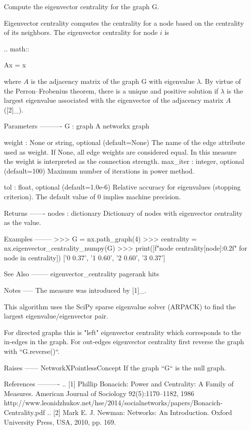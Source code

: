 \begin{DoxyVerb}Compute the eigenvector centrality for the graph G.

Eigenvector centrality computes the centrality for a node based on the
centrality of its neighbors. The eigenvector centrality for node $i$ is

.. math::

    Ax = \lambda x

where $A$ is the adjacency matrix of the graph G with eigenvalue $\lambda$.
By virtue of the Perron–Frobenius theorem, there is a unique and positive
solution if $\lambda$ is the largest eigenvalue associated with the
eigenvector of the adjacency matrix $A$ ([2]_).

Parameters
----------
G : graph
  A networkx graph

weight : None or string, optional (default=None)
  The name of the edge attribute used as weight.
  If None, all edge weights are considered equal.
  In this measure the weight is interpreted as the connection strength.
max_iter : integer, optional (default=100)
  Maximum number of iterations in power method.

tol : float, optional (default=1.0e-6)
   Relative accuracy for eigenvalues (stopping criterion).
   The default value of 0 implies machine precision.

Returns
-------
nodes : dictionary
   Dictionary of nodes with eigenvector centrality as the value.

Examples
--------
>>> G = nx.path_graph(4)
>>> centrality = nx.eigenvector_centrality_numpy(G)
>>> print([f"{node} {centrality[node]:0.2f}" for node in centrality])
['0 0.37', '1 0.60', '2 0.60', '3 0.37']

See Also
--------
eigenvector_centrality
pagerank
hits

Notes
-----
The measure was introduced by [1]_.

This algorithm uses the SciPy sparse eigenvalue solver (ARPACK) to
find the largest eigenvalue/eigenvector pair.

For directed graphs this is "left" eigenvector centrality which corresponds
to the in-edges in the graph. For out-edges eigenvector centrality
first reverse the graph with ``G.reverse()``.

Raises
------
NetworkXPointlessConcept
    If the graph ``G`` is the null graph.

References
----------
.. [1] Phillip Bonacich:
   Power and Centrality: A Family of Measures.
   American Journal of Sociology 92(5):1170–1182, 1986
   http://www.leonidzhukov.net/hse/2014/socialnetworks/papers/Bonacich-Centrality.pdf
.. [2] Mark E. J. Newman:
   Networks: An Introduction.
   Oxford University Press, USA, 2010, pp. 169.
\end{DoxyVerb}
 